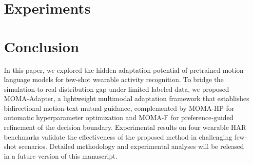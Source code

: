 \documentclass[journal]{IEEEtran}
\begin{document}
\section{Experiments}
\label{sec:exp}


\section{Conclusion}
\label{sec:conclusion}

In this paper, we explored the hidden adaptation potential of pretrained motion-language models for few-shot wearable activity recognition. To bridge the simulation-to-real distribution gap under limited labeled data, we proposed MOMA-Adapter, a lightweight multimodal adaptation framework that establishes bidirectional motion-text mutual guidance, complemented by MOMA-HP for automatic hyperparameter optimization and MOMA-F for preference-guided refinement of the decision boundary. Experimental results on four wearable HAR benchmarks validate the effectiveness of the proposed method in challenging few-shot scenarios. Detailed methodology and experimental analyses will be released in a future version of this manuscript.



\end{document}

